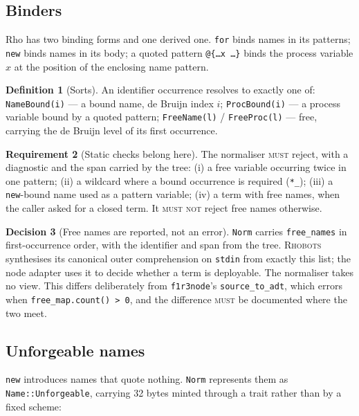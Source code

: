 \documentclass[11pt,a4paper]{article}
\newcommand{\code}[1]{\texttt{#1}}
\newcommand{\Rhobots}{\textsc{Rhobots}}
\newcommand{\MUST}{\textsc{must}}
\newcommand{\MUSTNOT}{\textsc{must not}}
\theoremstyle{definition}
\newtheorem{definition}{Definition}[section]
\newtheorem{requirement}[definition]{Requirement}
\newtheorem{decision}[definition]{Decision}
\theoremstyle{plain}
\begin{document}
\subsection{Binders}\label{sec:binders}

Rho has two binding forms and one derived one. \code{for} binds names in its
patterns; \code{new} binds names in its body; a quoted pattern
\code{@\{\ldots x \ldots\}} binds the process variable $x$ at the position of the
enclosing name pattern.

\begin{definition}[Sorts]
An identifier occurrence resolves to exactly one of: \code{NameBound(i)} --- a
bound name, de Bruijn index $i$; \code{ProcBound(i)} --- a process variable
bound by a quoted pattern; \code{FreeName(l)} / \code{FreeProc(l)} --- free,
carrying the de Bruijn level of its first occurrence.
\end{definition}

\begin{requirement}[Static checks belong here]\label{req:static}
The normaliser \MUST{} reject, with a diagnostic and the span carried by the
tree: (i) a free variable occurring twice in one pattern; (ii) a wildcard where
a bound occurrence is required (\code{*\_}); (iii) a \code{new}-bound name used
as a pattern variable; (iv) a term with free names, when the caller asked for a
closed term. It \MUSTNOT{} reject free names otherwise.
\end{requirement}

\begin{decision}[Free names are reported, not an error]\label{dec:free}
\code{Norm} carries \code{free\_names} in first-occurrence order, with the
identifier and span from the tree. \Rhobots{} synthesises its canonical outer
comprehension on \code{stdin} from exactly this list; the node adapter uses it to
decide whether a term is deployable. The normaliser takes no view. This differs
deliberately from \code{f1r3node}'s \code{source\_to\_adt}, which errors when
\code{free\_map.count() > 0}, and the difference \MUST{} be documented where the
two meet.
\end{decision}

\subsection{Unforgeable names}

\code{new} introduces names that quote nothing. \code{Norm} represents them as
\code{Name::Unforgeable}, carrying 32 bytes minted through a trait rather
than by a fixed scheme:
\end{document}
